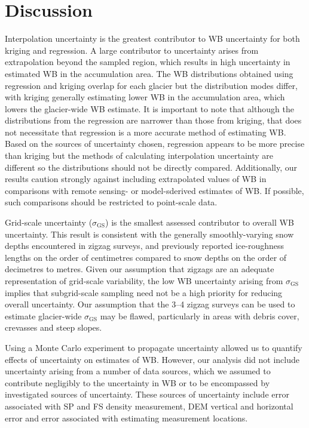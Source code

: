 \documentclass{sfuthesis}
\begin{document}
\section{Discussion}
\label{sec:Unc_discuss}


Interpolation uncertainty is the greatest contributor to WB uncertainty for both kriging and regression. A large contributor to uncertainty arises from extrapolation beyond the sampled region, which results in high uncertainty in estimated WB in the accumulation area. The WB distributions obtained using regression and kriging overlap for each glacier but the distribution modes differ, with kriging generally estimating lower WB in the accumulation area, which lowers the glacier-wide WB estimate. It is important to note that although the distributions from the regression are narrower than those from kriging, that does not necessitate that regression is a more accurate method of estimating WB. Based on the sources of uncertainty chosen, regression appears to be more precise than kriging but the methods of calculating interpolation uncertainty are different so the distributions should not be directly compared. Additionally, our results caution strongly against including extrapolated values of WB in comparisons with remote sensing- or model-sderived estimates of WB. If possible, such comparisons should be restricted to point-scale data.

Grid-scale uncertainty ($\sigma_{\mathrm{GS}}$) is the smallest assessed contributor to overall WB uncertainty. This result is consistent with the generally smoothly-varying snow depths encountered in zigzag surveys, and previously reported ice-roughness lengths on the order of centimetres \citep[e.g.][]{Hock2005} compared to snow depths on the order of decimetres to metres. Given our assumption that zigzags are an adequate representation of grid-scale variability, the low WB uncertainty arising from $\sigma_{\mathrm{GS}}$ implies that subgrid-scale sampling need not be a high priority for reducing overall uncertainty. Our assumption that the 3--4 zigzag surveys can be used to estimate glacier-wide $\sigma_{\mathrm{GS}}$ may be flawed, particularly in areas with debris cover, crevasses and steep slopes.

Using a Monte Carlo experiment to propagate uncertainty allowed us to quantify effects of uncertainty on estimates of WB. However, our analysis did not include uncertainty arising from a number of data sources, which we assumed to contribute negligibly to the uncertainty in WB or to be encompassed by investigated sources of uncertainty. These sources of uncertainty include error associated with SP and FS density measurement, DEM vertical and horizontal error and error associated with estimating measurement locations.
\end{document}
